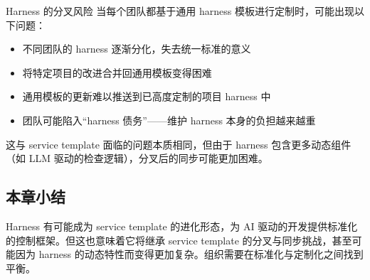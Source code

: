 \begin{warningbox}{Harness 的分叉风险}
当每个团队都基于通用 harness 模板进行定制时，可能出现以下问题：
\begin{itemize}[leftmargin=1.5em]
    \item 不同团队的 harness 逐渐分化，失去统一标准的意义
    \item 将特定项目的改进合并回通用模板变得困难
    \item 通用模板的更新难以推送到已高度定制的项目 harness 中
    \item 团队可能陷入``harness 债务''------维护 harness 本身的负担越来越重
\end{itemize}
这与 service template 面临的问题本质相同，但由于 harness 包含更多动态组件（如 LLM 驱动的检查逻辑），分叉后的同步可能更加困难。
\end{warningbox}

\subsection{本章小结}

Harness 有可能成为 service template 的进化形态，为 AI 驱动的开发提供标准化的控制框架。但这也意味着它将继承 service template 的分叉与同步挑战，甚至可能因为 harness 的动态特性而变得更加复杂。组织需要在标准化与定制化之间找到平衡。

\newpage

